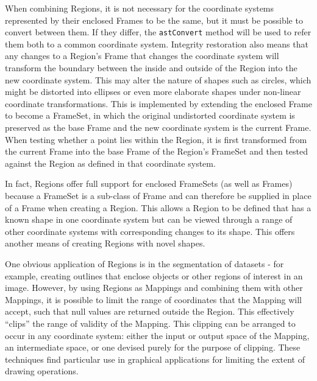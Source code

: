 \documentclass[final,authoryear,5p,times,twocolumn]{elsarticle}
\begin{document}
When combining Regions, it is not necessary for the coordinate systems
represented by their enclosed Frames to be the same, but it must be
possible to convert between them. If they differ, the \texttt{astConvert}
method
will be used to refer them both to a common coordinate system. Integrity
restoration also means that any changes to a Region's Frame that changes
the coordinate system will transform the boundary between the inside and
outside of the Region into the new coordinate system. This may alter the
nature of shapes such as circles, which might be distorted into ellipses
or even more elaborate shapes under non-linear coordinate
transformations. This is implemented by extending the enclosed Frame to
become a FrameSet, in which the original undistorted coordinate system is
preserved as the base Frame and the new coordinate system is the current
Frame. When testing whether a point lies within the Region, it is first
transformed from the current Frame into the base Frame of the Region's
FrameSet and then tested against the Region as defined in that coordinate
system.

In fact, Regions offer full support for enclosed FrameSets (as well as
Frames) because a FrameSet is a sub-class of Frame and can therefore be
supplied in place of a Frame when creating a Region. This allows a Region
to be defined that has a known shape in one coordinate system but can be
viewed through a range of other coordinate systems with corresponding
changes to its shape. This offers another means of creating Regions with
novel shapes.

One obvious application of Regions is in the segmentation of datasets -
for example, creating outlines that enclose objects or other regions of
interest in an image. However, by using Regions as Mappings and combining
them with other Mappings, it is possible to limit the range of
coordinates that the Mapping will accept, such that null values are
returned outside the Region. This effectively ``clips'' the range of
validity of the Mapping. This clipping can be arranged to occur in any
coordinate system: either the input or output space of the Mapping, an
intermediate space, or one devised purely for the purpose of clipping.
These techniques find particular use in graphical applications for
limiting the extent of drawing operations.
\end{document}
